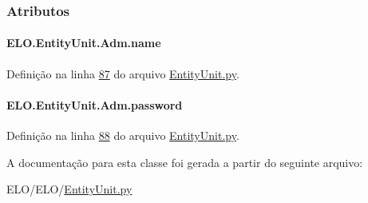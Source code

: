 \subsubsection{Atributos}
\hypertarget{classELO_1_1EntityUnit_1_1Adm_a12f7aaf17dc6e036186e7757244cd12a}{
\paragraph[{name}]{\setlength{\rightskip}{0pt plus 5cm}E\-L\-O.\-Entity\-Unit.\-Adm.\-name}}\label{classELO_1_1EntityUnit_1_1Adm_a12f7aaf17dc6e036186e7757244cd12a}


Definição na linha \hyperlink{EntityUnit_8py_source_l00087}{87} do arquivo \hyperlink{EntityUnit_8py_source}{Entity\-Unit.\-py}.

\hypertarget{classELO_1_1EntityUnit_1_1Adm_aed97c3f4efa1320ef99b3794b51f8e5e}{
\paragraph[{password}]{\setlength{\rightskip}{0pt plus 5cm}E\-L\-O.\-Entity\-Unit.\-Adm.\-password}}\label{classELO_1_1EntityUnit_1_1Adm_aed97c3f4efa1320ef99b3794b51f8e5e}


Definição na linha \hyperlink{EntityUnit_8py_source_l00088}{88} do arquivo \hyperlink{EntityUnit_8py_source}{Entity\-Unit.\-py}.



A documentação para esta classe foi gerada a partir do seguinte arquivo\-:\begin{DoxyCompactItemize}
\item 
E\-L\-O/\-E\-L\-O/\hyperlink{EntityUnit_8py}{Entity\-Unit.\-py}\end{DoxyCompactItemize}
